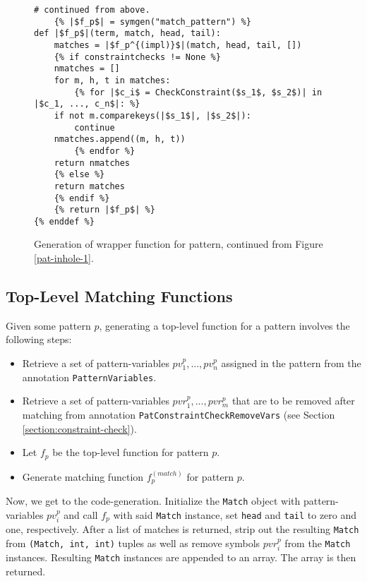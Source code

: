 \begin{figure}[!htb]
\begin{verbatim}
# continued from above.
	{% |$f_p$| = symgen("match_pattern") %}
def |$f_p$|(term, match, head, tail):
	matches = |$f_p^{(impl)}$|(match, head, tail, [])
	{% if constraintchecks != None %}
	nmatches = []
	for m, h, t in matches:
		{% for |$c_i$ = CheckConstraint($s_1$, $s_2$)| in |$c_1, ..., c_n$|: %}
	if not m.comparekeys(|$s_1$|, |$s_2$|):
		continue
	nmatches.append((m, h, t))
		{% endfor %}
	return nmatches
	{% else %}
	return matches
	{% endif %}
	{% return |$f_p$| %}
{% enddef %}
\end{verbatim}
\caption{Generation of wrapper function for \PatternInHoleNoArg \space pattern, continued from Figure \ref{pat-inhole-1}.}
\label{pat-inhole-2}
\end{figure}

\subsection{Top-Level Matching Functions}
Given some pattern $p$, generating a top-level function for a pattern involves the following steps:

\begin{itemize}
\item Retrieve a set of pattern-variables $pv_1^{p}, ..., pv_n^{p}$ assigned in the pattern from the annotation \texttt{PatternVariables}.
\item Retrieve a set of pattern-variables $pvr_1^{p}, ..., pvr_m^{p}$ that are to be removed after matching from annotation \texttt{PatConstraintCheckRemoveVars} (see Section \ref{section:constraint-check}).
\item Let $f_p$ be the top-level function for pattern $p$.
\item Generate matching function $f_p^{(match)}$ for pattern $p$.
\end{itemize}

Now, we get to the code-generation. Initialize the \texttt{Match} object with pattern-variables $pv_i^{p}$ and call $f_p$ with said \texttt{Match} instance, set \texttt{head} and \texttt{tail} to zero and one, respectively. After a list of matches is returned, strip out the resulting \texttt{Match} from \texttt{(Match, int, int)}  tuples as well as remove symbols $pvr_i^{p}$ from the \texttt{Match} instances. Resulting \texttt{Match} instances are appended to an array. The array is then returned.


